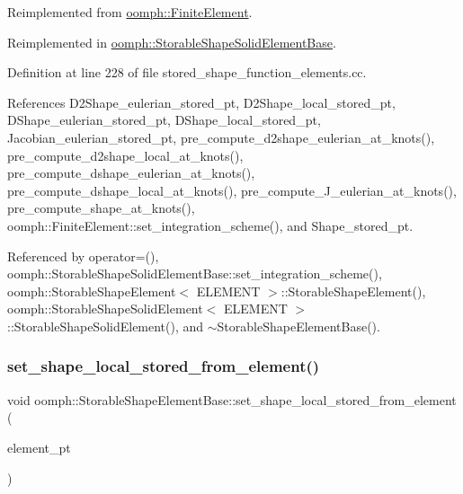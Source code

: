 Reimplemented from \hyperlink{classoomph_1_1FiniteElement_ac80983f27f5bcbc08e2eeb6e4d03698b}{oomph\+::\+Finite\+Element}.



Reimplemented in \hyperlink{classoomph_1_1StorableShapeSolidElementBase_acca94924abe9b0a0572ed0a73efb600a}{oomph\+::\+Storable\+Shape\+Solid\+Element\+Base}.



Definition at line 228 of file stored\+\_\+shape\+\_\+function\+\_\+elements.\+cc.



References D2\+Shape\+\_\+eulerian\+\_\+stored\+\_\+pt, D2\+Shape\+\_\+local\+\_\+stored\+\_\+pt, D\+Shape\+\_\+eulerian\+\_\+stored\+\_\+pt, D\+Shape\+\_\+local\+\_\+stored\+\_\+pt, Jacobian\+\_\+eulerian\+\_\+stored\+\_\+pt, pre\+\_\+compute\+\_\+d2shape\+\_\+eulerian\+\_\+at\+\_\+knots(), pre\+\_\+compute\+\_\+d2shape\+\_\+local\+\_\+at\+\_\+knots(), pre\+\_\+compute\+\_\+dshape\+\_\+eulerian\+\_\+at\+\_\+knots(), pre\+\_\+compute\+\_\+dshape\+\_\+local\+\_\+at\+\_\+knots(), pre\+\_\+compute\+\_\+\+J\+\_\+eulerian\+\_\+at\+\_\+knots(), pre\+\_\+compute\+\_\+shape\+\_\+at\+\_\+knots(), oomph\+::\+Finite\+Element\+::set\+\_\+integration\+\_\+scheme(), and Shape\+\_\+stored\+\_\+pt.



Referenced by operator=(), oomph\+::\+Storable\+Shape\+Solid\+Element\+Base\+::set\+\_\+integration\+\_\+scheme(), oomph\+::\+Storable\+Shape\+Element$<$ E\+L\+E\+M\+E\+N\+T $>$\+::\+Storable\+Shape\+Element(), oomph\+::\+Storable\+Shape\+Solid\+Element$<$ E\+L\+E\+M\+E\+N\+T $>$\+::\+Storable\+Shape\+Solid\+Element(), and $\sim$\+Storable\+Shape\+Element\+Base().

\mbox{\label{classoomph_1_1StorableShapeElementBase_aa0f11d26e348ffbf3bef39ee76a43bfb}} 
\subsubsection{\texorpdfstring{set\+\_\+shape\+\_\+local\+\_\+stored\+\_\+from\+\_\+element()}{set\_shape\_local\_stored\_from\_element()}}
{\footnotesize\ttfamily void oomph\+::\+Storable\+Shape\+Element\+Base\+::set\+\_\+shape\+\_\+local\+\_\+stored\+\_\+from\+\_\+element (\begin{DoxyParamCaption}\item[{\hyperlink{classoomph_1_1StorableShapeElementBase}{Storable\+Shape\+Element\+Base} $\ast$const \&}]{element\+\_\+pt }\end{DoxyParamCaption})}



